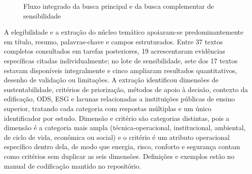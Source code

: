 \begin{figure}[htbp]
\centering
{}
\caption{Fluxo integrado da busca principal e da busca complementar de sensibilidade}
\label{fig:funil}
\end{figure}

A elegibilidade e a extração do núcleo temático apoiaram-se predominantemente em título, resumo, palavras-chave e campos estruturados. Entre 37 textos completos consultados em tarefas posteriores, 19 acrescentaram evidências específicas citadas individualmente; no lote de sensibilidade, sete dos 17 textos estavam disponíveis integralmente e cinco ampliaram resultados quantitativos, desenho de validação ou limitações. A extração identificou dimensões de sustentabilidade, critérios de priorização, métodos de apoio à decisão, contexto da edificação, ODS, ESG e lacunas relacionadas a instituições públicas de ensino superior, tratando cada categoria com respostas múltiplas e um único identificador por estudo. Dimensão e critério são categorias distintas, pois a dimensão é a categoria mais ampla (técnica-operacional, institucional, ambiental, de ciclo de vida, econômica ou social) e o critério é um atributo operacional específico dentro dela, de modo que energia, risco, conforto e segurança contam como critérios sem duplicar as seis dimensões. Definições e exemplos estão no manual de codificação mantido no repositório.

